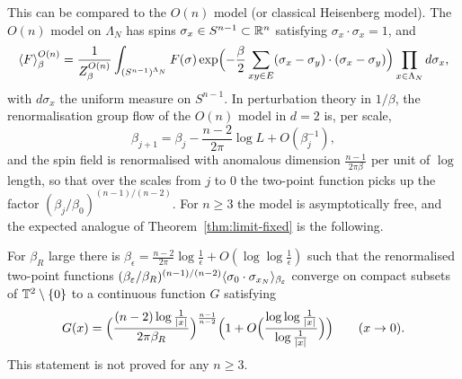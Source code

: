 \documentclass[11pt]{amsart}
\numberwithin{equation}{section}
\numberwithin{theorem}{section}
\begin{document}
This can be compared to the $O(n)$ model (or classical Heisenberg model).
The $O(n)$ model on $\Lambda_N$ has spins $\sigma_x\in S^{n-1}\subset\mathbb{R}^n$ satisfying $\sigma_x\cdot\sigma_x=1$, and
\begin{equation}\label{e:On-def}
  \langle F \rangle^{O(n)}_\beta=\frac1{Z^{O(n)}_\beta}\int_{(S^{n-1})^{\Lambda_N}}F(\sigma)
  \exp\Bigl(-\frac\beta2\sum_{xy\in E}(\sigma_x-\sigma_y)\cdot(\sigma_x-\sigma_y)\Bigr)\prod_{x\in\Lambda_N}d\sigma_x ,
\end{equation}
with $d\sigma_x$ the uniform measure on $S^{n-1}$.
In perturbation theory in $1/\beta$, the renormalisation
group flow of the $O(n)$ model in $d=2$ is, per scale,
\begin{equation}\label{e:On-flow}
  \beta_{j+1}=\beta_j-\frac{n-2}{2\pi}\log L+O(\beta_j^{-1}),
\end{equation}
and the spin field is renormalised with anomalous dimension $\frac{n-1}{2\pi\beta}$ per unit of
$\log$ length, so that over the scales from $j$ to $0$ the two-point function picks up the factor
$(\beta_j/\beta_0)^{(n-1)/(n-2)}$. For $n\ge3$ the model is asymptotically free, and the expected
analogue of Theorem~\ref{thm:limit-fixed} is the following.

\begin{conjecture}
For $\beta_R$ large there is
$\beta_\epsilon=\frac{n-2}{2\pi}\log\frac1\epsilon+O(\log\log\frac1\epsilon)$ such that the
renormalised two-point functions $(\beta_\varepsilon/\beta_R)^{(n-1)/(n-2)}\langle \sigma_0\cdot\sigma_{x_N} \rangle_{\beta_\varepsilon}$
converge on compact subsets of $\mathbb{T}^2\setminus\{0\}$ to a continuous function $G$ satisfying
\begin{equation}\label{e:On-short}
  G(x)=\Bigl(\frac{(n-2)\log\frac1{|x|}}{2\pi\beta_R}\Bigr)^{\frac{n-1}{n-2}}
  \Bigl(1+O\Bigl(\frac{\log\log\frac1{|x|}}{\log\frac1{|x|}}\Bigr)\Bigr)\qquad(x\to0).
\end{equation}
This statement is not proved for any $n\ge3$.
\end{conjecture}
\end{document}
